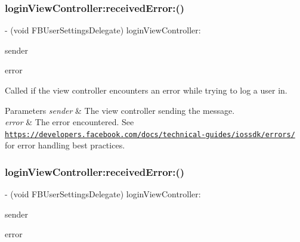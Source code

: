 \subsubsection{\texorpdfstring{login\+View\+Controller\+:received\+Error\+:()}{loginViewController:receivedError:()}\hspace{0.1cm}{\footnotesize\ttfamily [1/5]}}
{\footnotesize\ttfamily -\/ (void F\+B\+User\+Settings\+Delegate) login\+View\+Controller\+: \begin{DoxyParamCaption}\item[{(id)}]{sender }\item[{receivedError:(N\+S\+Error $\ast$)}]{error }\end{DoxyParamCaption}\hspace{0.3cm}{\ttfamily [optional]}}

Called if the view controller encounters an error while trying to log a user in.


\begin{DoxyParams}{Parameters}
{\em sender} & The view controller sending the message. \\
\hline
{\em error} & The error encountered.  See \href{https://developers.facebook.com/docs/technical-guides/iossdk/errors/}{\tt https\+://developers.\+facebook.\+com/docs/technical-\/guides/iossdk/errors/} for error handling best practices. \\
\hline
\end{DoxyParams}
\mbox{\label{protocolFBUserSettingsDelegate_01-p_aa7340081c0402e123cdde904f5cf2c91}} 
\subsubsection{\texorpdfstring{login\+View\+Controller\+:received\+Error\+:()}{loginViewController:receivedError:()}\hspace{0.1cm}{\footnotesize\ttfamily [2/5]}}
{\footnotesize\ttfamily -\/ (void F\+B\+User\+Settings\+Delegate) login\+View\+Controller\+: \begin{DoxyParamCaption}\item[{(id)}]{sender }\item[{receivedError:(N\+S\+Error $\ast$)}]{error }\end{DoxyParamCaption}\hspace{0.3cm}{\ttfamily [optional]}}

